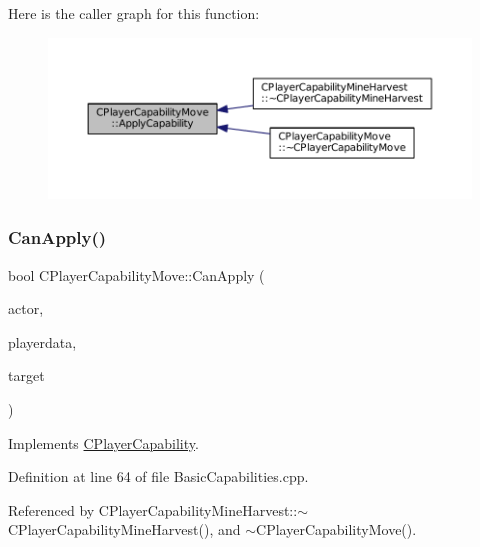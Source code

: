 Here is the caller graph for this function\+:\nopagebreak
\begin{figure}[H]
\begin{center}
\leavevmode
\includegraphics[width=350pt]{classCPlayerCapabilityMove_ade3f4e72612cbf2ad73a6c2e6aa843df_icgraph}
\end{center}
\end{figure}
\hypertarget{classCPlayerCapabilityMove_a76cbb0fa4051961c00e3169d11d76568}{}\label{classCPlayerCapabilityMove_a76cbb0fa4051961c00e3169d11d76568} 
\subsubsection{\texorpdfstring{Can\+Apply()}{CanApply()}}
{\footnotesize\ttfamily bool C\+Player\+Capability\+Move\+::\+Can\+Apply (\begin{DoxyParamCaption}\item[{std\+::shared\+\_\+ptr$<$ \hyperlink{classCPlayerAsset}{C\+Player\+Asset} $>$}]{actor,  }\item[{std\+::shared\+\_\+ptr$<$ \hyperlink{classCPlayerData}{C\+Player\+Data} $>$}]{playerdata,  }\item[{std\+::shared\+\_\+ptr$<$ \hyperlink{classCPlayerAsset}{C\+Player\+Asset} $>$}]{target }\end{DoxyParamCaption})\hspace{0.3cm}{\ttfamily [virtual]}}



Implements \hyperlink{classCPlayerCapability_ae96263e0950f496492f8baeb877b9554}{C\+Player\+Capability}.



Definition at line 64 of file Basic\+Capabilities.\+cpp.



Referenced by C\+Player\+Capability\+Mine\+Harvest\+::$\sim$\+C\+Player\+Capability\+Mine\+Harvest(), and $\sim$\+C\+Player\+Capability\+Move().


